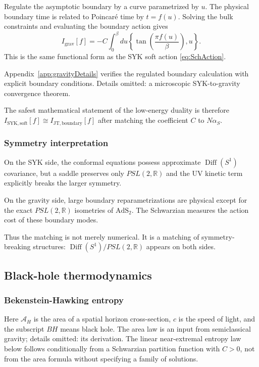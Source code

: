 \documentclass[11pt]{article}
\numberwithin{equation}{section}
\theoremstyle{exposition}
\theoremstyle{result}
\newcommand{\R}{\mathbb R}
\newcommand{\Diff}{\operatorname{Diff}}
\newcommand{\AdS}{\mathrm{AdS}}
\begin{document}
Regulate the asymptotic boundary by a curve parametrized by $u$. The physical boundary time is related to Poincar\'e time by $t=f(u)$. Solving the bulk constraints and evaluating the boundary action gives
\begin{equation}
I_{\mathrm{grav}}[f]
=-C\int_0^\beta du
\left\{
\tan\left(\frac{\pi f(u)}{\beta}\right),u
\right\}.
\label{eq:gravsch}
\end{equation}
This is the same functional form as the SYK soft action \eqref{eq:SchAction}.

Appendix~\ref{app:gravityDetails} verifies the regulated boundary calculation with explicit boundary conditions. Details omitted: a microscopic SYK-to-gravity convergence theorem.

The safest mathematical statement of the low-energy duality is therefore $I_{\mathrm{SYK,soft}}[f] \cong I_{\mathrm{JT,boundary}}[f]$ after matching the coefficient $C$ to $N\alpha_S$.

\subsubsection{Symmetry interpretation}

On the SYK side, the conformal equations possess approximate $\Diff(S^1)$ covariance, but a saddle preserves only $PSL(2,\R)$ and the UV kinetic term explicitly breaks the larger symmetry.

On the gravity side, large boundary reparametrizations are physical except for the exact $PSL(2,\R)$ isometries of $\AdS_2$. The Schwarzian measures the action cost of these boundary modes.

Thus the matching is not merely numerical. It is a matching of symmetry-breaking structures: $\Diff(S^1)/PSL(2,\R)$ appears on both sides.

\subsection{Black-hole thermodynamics}

\subsubsection{Bekenstein-Hawking entropy}


Here $\mathcal A_H$ is the area of a spatial horizon cross-section, $c$ is the speed of light, and the subscript $BH$ means black hole. The area law is an input from semiclassical gravity; details omitted: its derivation. The linear near-extremal entropy law below follows conditionally from a Schwarzian partition function with $C>0$, not from the area formula without specifying a family of solutions.
\end{document}
